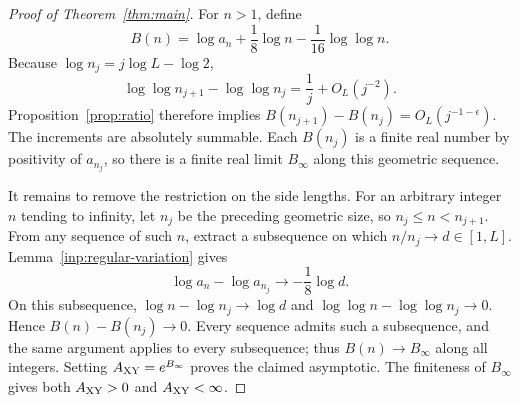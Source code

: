 \begin{proof}[Proof of Theorem~\ref{thm:main}]
For $n>1$, define
\[
 B(n)=\log a_n+\frac18\log n-\frac1{16}\log\log n.
\]
Because $\log n_j=j\log L-\log2$,
\[
 \log\log n_{j+1}-\log\log n_j
       =\frac1j+O_L(j^{-2}).
\]
Proposition~\ref{prop:ratio} therefore implies
$B(n_{j+1})-B(n_j)=O_L(j^{-1-\epsilon})$.
The increments are absolutely summable.  Each $B(n_j)$ is a finite
real number by positivity of $a_{n_j}$, so there is a finite real
limit $B_\infty$ along this geometric sequence.

It remains to remove the restriction on the side lengths.  For an
arbitrary integer $n$ tending to infinity, let $n_j$ be the preceding
geometric size, so $n_j\leq n<n_{j+1}$.  From any sequence of such
$n$, extract a subsequence on which $n/n_j\to d\in[1,L]$.
Lemma~\ref{inp:regular-variation} gives
\[
 \log a_n-\log a_{n_j}\longrightarrow-\frac18\log d.
\]
On this subsequence, $\log n-\log n_j\to\log d$ and
$\log\log n-\log\log n_j\to0$.  Hence
$B(n)-B(n_j)\to0$.  Every sequence admits such a subsequence, and the
same argument applies to every subsequence; thus $B(n)\to B_\infty$
along all integers.  Setting $A_{\rm XY}=e^{B_\infty}$ proves the
claimed asymptotic.  The finiteness of $B_\infty$ gives both
$A_{\rm XY}>0$ and $A_{\rm XY}<\infty$.
\end{proof}
